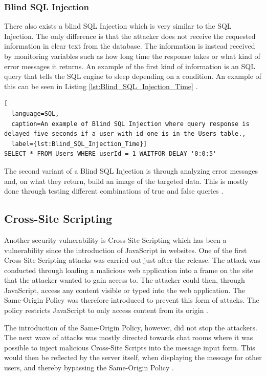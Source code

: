 \subsubsection{Blind SQL Injection}
There also exists a blind SQL Injection which is very similar to the SQL Injection. The only difference is that the attacker does not receive the requested information in clear text from the database. The information is instead received by monitoring variables such as how long time the response takes or what kind of error messages it returns. An example of the first kind of information is an SQL query that tells the SQL engine to sleep depending on a condition. An example of this can be seen in Listing \ref{lst:Blind_SQL_Injection_Time} \parencite{JustinClarke-Salt2009SIAa, Secure_Web}.

\hfill
\begin{lstlisting}[
  language=SQL,
  caption=An example of Blind SQL Injection where query response is delayed five seconds if a user with id one is in the Users table.,
  label={lst:Blind_SQL_Injection_Time}]
SELECT * FROM Users WHERE userId = 1 WAITFOR DELAY '0:0:5'
\end{lstlisting}
\hfill

The second variant of a Blind SQL Injection is through analyzing error messages and, on what they return, build an image of the targeted data. This is mostly done through testing different combinations of true and false queries \parencite{JustinClarke-Salt2009SIAa, Secure_Web}.



\subsection{Cross-Site Scripting}
Another security vulnerability is Cross-Site Scripting which has been a vulnerability since the introduction of JavaScript in websites. One of the first Cross-Site Scripting attacks was carried out just after the release. The attack was conducted through loading a malicious web application into a frame on the site that the attacker wanted to gain access to. The attacker could then, through JavaScript, access any content visible or typed into the web application. The  Same-Origin Policy was therefore introduced to prevent this form of attacks. The policy restricts JavaScript to only access content from its origin \parencite{FogieSeth2007Xacs, w3csop}.

The introduction of the Same-Origin Policy, however, did not stop the attackers. The next wave of attacks was mostly directed towards chat rooms where it was possible to inject malicious Cross-Site Scripts into the message input form. This would then be reflected by the server itself, when displaying the message for other users, and thereby bypassing the Same-Origin Policy \parencite{FogieSeth2007Xacs}.

